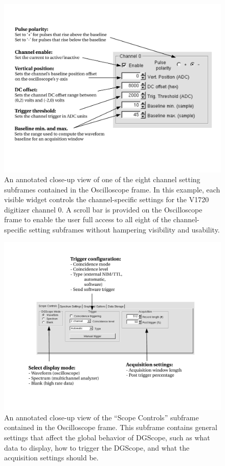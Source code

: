 \begin{figure}
  \centering
  \includegraphics[width=6in]{figures/OscilloscopeChannel}
  \caption{An annotated close-up view of one of the eight channel
    setting subframes contained in the Oscilloscope frame. In this
    example, each visible widget controls the channel-specific
    settings for the V1720 digitizer channel 0. A scroll bar is
    provided on the Oscilloscope frame to enable the user full access to
    all eight of the channel-specific setting subframes without
    hampering visibility and usability.}
  \label{fig:channel}
\end{figure}

\begin{figure}
  \centering
  \includegraphics[width=6in]{figures/OscilloscopeScope}
  \caption{An annotated close-up view of the ``Scope Controls'' subframe
    contained in the Oscilloscope frame. This subframe contains general
    settings that affect the global behavior of DGScope, such as what
    data to display, how to trigger the DGScope, and what the
    acquisition settings should be.}
  \label{fig:scopesubframe}
\end{figure}

